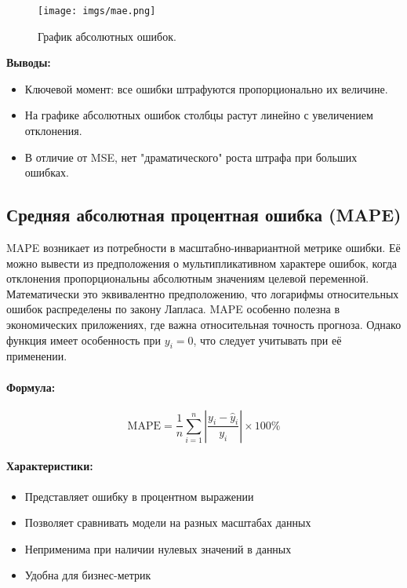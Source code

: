 \begin{figure}[h!]
    \centering
    \texttt{[image: imgs/mae.png]}
    \caption{График абсолютных ошибок.}
    \label{fig:mae_graph}
\end{figure}

\noindent\textbf{Выводы:}
\begin{itemize}
    \item Ключевой момент: все ошибки штрафуются пропорционально их величине.
    \item На графике абсолютных ошибок столбцы растут линейно с увеличением отклонения.
    \item В отличие от MSE, нет "драматического" роста штрафа при больших ошибках.
\end{itemize}


    

\subsection{Средняя абсолютная процентная ошибка (MAPE)}

MAPE возникает из потребности в масштабно-инвариантной метрике ошибки. Её можно вывести из предположения о мультипликативном характере ошибок, когда отклонения пропорциональны абсолютным значениям целевой переменной. Математически это эквивалентно предположению, что логарифмы относительных ошибок распределены по закону Лапласа. MAPE особенно полезна в экономических приложениях, где важна относительная точность прогноза. Однако функция имеет особенность при $y_i = 0$, что следует учитывать при её применении.

\paragraph{Формула:}
\[
\text{MAPE} = \frac{1}{n} \sum_{i=1}^{n} \left|\frac{y_i - \hat{y}_i}{y_i}\right| \times 100\%
\]

\paragraph{Характеристики:}
\begin{itemize}
    \item Представляет ошибку в процентном выражении
    \item Позволяет сравнивать модели на разных масштабах данных
    \item Неприменима при наличии нулевых значений в данных
    \item Удобна для бизнес-метрик
\end{itemize}

